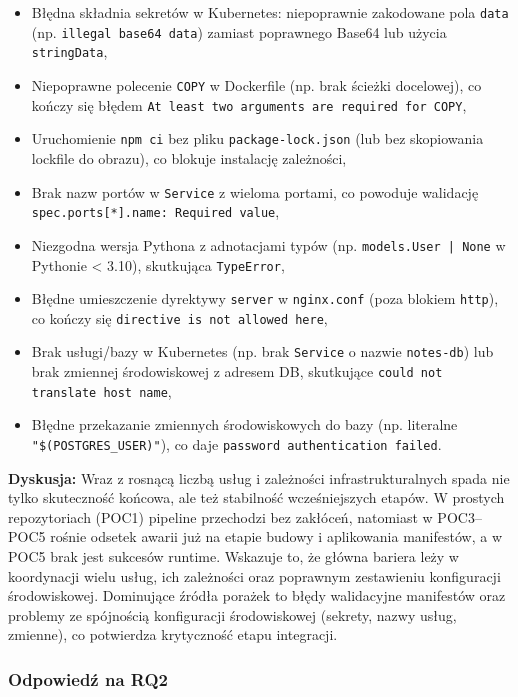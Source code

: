 \begin{itemize}
    \item Błędna składnia sekretów w Kubernetes: niepoprawnie zakodowane pola \texttt{data} (np. \texttt{illegal base64 data}) zamiast poprawnego Base64 lub użycia \texttt{stringData},
    \item Niepoprawne polecenie \texttt{COPY} w Dockerfile (np. brak ścieżki docelowej), co kończy się błędem \texttt{At least two arguments are required for COPY},
    \item Uruchomienie \texttt{npm ci} bez pliku \texttt{package-lock.json} (lub bez skopiowania lockfile do obrazu), co blokuje instalację zależności,
    \item Brak nazw portów w \texttt{Service} z wieloma portami, co powoduje walidację \texttt{spec.ports[*].name: Required value},
    \item Niezgodna wersja Pythona z adnotacjami typów (np. \texttt{models.User | None} w Pythonie < 3.10), skutkująca \texttt{TypeError},
    \item Błędne umieszczenie dyrektywy \texttt{server} w \texttt{nginx.conf} (poza blokiem \texttt{http}), co kończy się \texttt{directive is not allowed here},
    \item Brak usługi/bazy w Kubernetes (np. brak \texttt{Service} o nazwie \texttt{notes-db}) lub brak zmiennej środowiskowej z adresem DB, skutkujące \texttt{could not translate host name},
    \item Błędne przekazanie zmiennych środowiskowych do bazy (np. literalne \texttt{"\$(POSTGRES\_USER)"}), co daje \texttt{password authentication failed}.
\end{itemize}

\textbf{Dyskusja:} Wraz z rosnącą liczbą usług i zależności infrastrukturalnych spada nie tylko skuteczność końcowa, ale też stabilność wcześniejszych etapów. W prostych repozytoriach (POC1) pipeline przechodzi bez zakłóceń, natomiast w POC3--POC5 rośnie odsetek awarii już na etapie budowy i aplikowania manifestów, a w POC5 brak jest sukcesów runtime. Wskazuje to, że główna bariera leży w koordynacji wielu usług, ich zależności oraz poprawnym zestawieniu konfiguracji środowiskowej. Dominujące źródła porażek to błędy walidacyjne manifestów oraz problemy ze spójnością konfiguracji środowiskowej (sekrety, nazwy usług, zmienne), co potwierdza krytyczność etapu integracji.

\subsubsection{Odpowiedź na RQ2}

